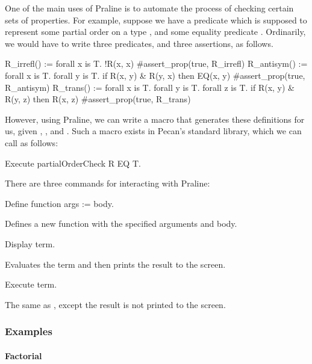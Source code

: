 One of the main uses of Praline is to automate the process of checking certain sets of properties.
For example, suppose we have a predicate  which is supposed to represent some partial order on a type , and some equality predicate .
Ordinarily, we would have to write three predicates, and three assertions, as follows.

\begin{pecan}
R_irrefl() := forall x is T. !R(x, x)
#assert_prop(true, R_irrefl)
R_antisym() := forall x is T. forall y is T. if R(x, y) & R(y, x) then EQ(x, y)
#assert_prop(true, R_antisym)
R_trans() := forall x is T. forall y is T. forall z is T. 
              if R(x, y) & R(y, z) then R(x, z)
#assert_prop(true, R_trans)
\end{pecan}

However, using Praline, we can write a macro that generates these definitions for us, given , , and .
Such a macro exists in Pecan's standard library, which we can call as follows:

\begin{pecan}
Execute partialOrderCheck R EQ T.
\end{pecan}

There are three commands for interacting with Praline:

\begin{pecan}
Define function args := body.
\end{pecan}

Defines a new function with the specified arguments and body.

\begin{pecan}
Display term.
\end{pecan}

Evaluates the term and then prints the result to the screen.

\begin{pecan}
Execute term.
\end{pecan}

The same as , except the result is not printed to the screen.

\subsubsection{Examples}

\paragraph{Factorial}

